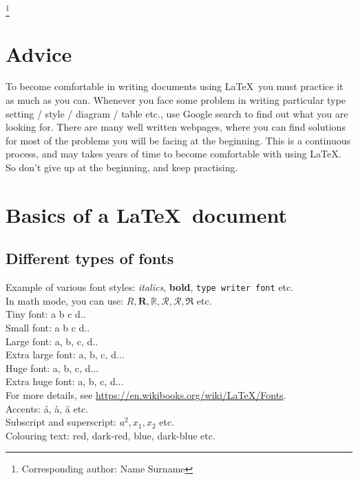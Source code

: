 \documentclass[11pt,leqno]{amsart}
\numberwithin{equation}{subsection}
\theoremstyle{definition}
\newenvironment{nouppercase}{%
\let\uppercase\relax%
\renewcommand{\uppercasenonmath}[1]{}}{}
\begin{document}
\date{\today}

\thanks{Corresponding author: Name Surname}


\begin{nouppercase}
	\maketitle
\end{nouppercase}

\tableofcontents

\begin{abstract}
In this article, we learn some basics of writing documents using \LaTeX. 
\end{abstract}


\section{Advice} 
To become comfortable in writing documents using \LaTeX\, you must practice it as much as you can. 
Whenever you face some problem in writing particular type setting / style / diagram / table etc., 
use Google search to find out what you are looking for. There are many well written webpages, 
where you can find solutions for most of the problems you will be facing at the beginning. 
This is a continuous process, and may takes years of time to become comfortable with using \LaTeX. 
So don't give up at the beginning, and keep practising. 


\section{Basics of a \LaTeX\ document}
\subsection{Different types of fonts}
Example of various font styles: 
{\it italics}, {\bf bold}, {\tt type writer font} etc. \\ 
In math mode, you can use: $R, \mathbf{R}, \mathbb{R}, \mathcal{R}, \mathscr{R}, \mathfrak{R}$ etc. \\ 
Tiny font: {\tiny a b c d..} \\ 
Small font: {\small a b c d..} \\ 
Large font: {\large a, b, c, d..} \\ 
Extra large font: {\Large a, b, c, d...} \\ 
Huge font: {\huge a, b, c, d...} \\ 
Extra huge font: {\Huge a, b, c, d...} \\ 
For more details, see \href{https://en.wikibooks.org/wiki/LaTeX/Fonts}{https://en.wikibooks.org/wiki/LaTeX/Fonts}. \\ 
Accents: \'a, \`a, \"a etc. \\ 
Subscript and superscript: $a^2, x_1, x_2$ etc. \\ 
Colouring text: {\color{red} red}, {\color{mdtRed} dark-red}, {\color{blue} blue}, {\color{dblue} dark-blue} etc. \\ 
\end{document}
